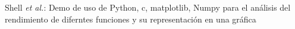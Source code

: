 \documentclass[10pt,journal,compsoc]{IEEEtran}
\begin{document}
% 
%



%
{Shell \MakeLowercase{\textit{et al.}}: Demo de uso de Python, c, matplotlib, Numpy para el análisis del rendimiento de diferntes funciones y su representación en una gráfica}
% 



\end{document}
